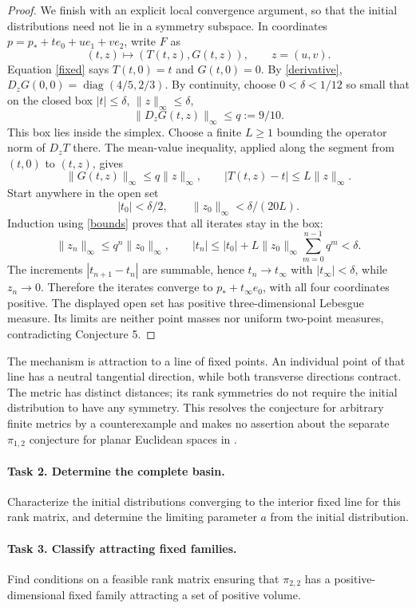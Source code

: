 \documentclass[11pt]{article}
\begin{document}
\begin{proof}
We finish with an explicit local convergence argument, so that the initial
distributions need not lie in a symmetry subspace. In coordinates
$p=p_*+t e_0+u e_1+v e_2$, write $F$ as
\[
 (t,z)\longmapsto (T(t,z),G(t,z)),\qquad z=(u,v).
\]
Equation \eqref{fixed} says $T(t,0)=t$ and $G(t,0)=0$. By
\eqref{derivative}, $D_zG(0,0)=\operatorname{diag}(4/5,2/3)$.
By continuity, choose $0<\delta<1/12$ so small that on the closed box
$|t|\le\delta$, $\|z\|_\infty\le\delta$,
\[
 \|D_zG(t,z)\|_\infty\le q:=9/10.
\]
This box lies inside the simplex. Choose a finite $L\ge1$ bounding the
operator norm of $D_zT$ there. The mean-value inequality, applied along
the segment from $(t,0)$ to $(t,z)$, gives
\begin{equation}\label{bounds}
 \|G(t,z)\|_\infty\le q\|z\|_\infty,
 \qquad |T(t,z)-t|\le L\|z\|_\infty.
\end{equation}
Start anywhere in the open set
\[
 |t_0|<\delta/2,\qquad \|z_0\|_\infty<\delta/(20L).
\]
Induction using \eqref{bounds} proves that all iterates stay in the box:
\[
 \|z_n\|_\infty\le q^n\|z_0\|_\infty,
 \qquad
 |t_n|\le |t_0|+L\|z_0\|_\infty\sum_{m=0}^{n-1}q^m<\delta.
\]
The increments $|t_{n+1}-t_n|$ are summable, hence $t_n\to t_\infty$
with $|t_\infty|<\delta$, while $z_n\to0$. Therefore the iterates
converge to $p_*+t_\infty e_0$, with all four coordinates positive.
The displayed open set has positive three-dimensional Lebesgue measure.
Its limits are neither point masses nor uniform two-point measures,
contradicting Conjecture 5.
\end{proof}

The mechanism is attraction to a line of fixed points. An individual point
of that line has a neutral tangential direction, while both transverse
directions contract. The metric has distinct distances; its rank symmetries
do not require the initial distribution to have any symmetry. This resolves
the conjecture for arbitrary finite metrics by a counterexample and makes
no assertion about the separate $\pi_{1,2}$ conjecture for planar Euclidean
spaces in \cite{ACF}.

\paragraph{Task 2. Determine the complete basin.}
Characterize the initial distributions converging to the interior fixed
line for this rank matrix, and determine the limiting parameter $a$ from
the initial distribution.

\paragraph{Task 3. Classify attracting fixed families.}
Find conditions on a feasible rank matrix ensuring that $\pi_{2,2}$ has
a positive-dimensional fixed family attracting a set of positive volume.
\end{document}
